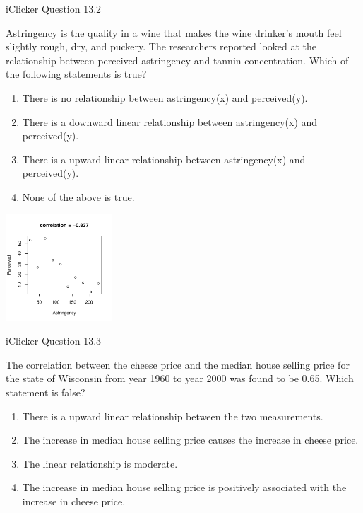 \documentclass[14pt]{beamer}\usepackage[]{graphicx}\usepackage[]{color}
\begin{document}
\begin{frame}[fragile]{iClicker Question 13.2}

{\small{
Astringency is the quality in a wine that makes the wine drinker's mouth feel slightly rough, dry, and puckery.  The researchers reported looked at the relationship between perceived astringency and tannin concentration.  Which of the following  statements is true?
}}

\vspace{3mm}

\begin{minipage}[ht]{6cm}

{\footnotesize{
\begin{enumerate}
\item There is no relationship between  astringency(x) and perceived(y).
\item There is a downward linear  relationship between astringency(x) and perceived(y).
\item There is a upward linear relationship  between astringency(x) and perceived(y).
\item None of the above is true.
\end{enumerate}
}}
\end{minipage} \hfill
\begin{minipage}[ht]{4cm}



\includegraphics[width=4cm]{figure/LBL13b-1} 

\end{minipage}
\end{frame}

\begin{frame}[fragile]{iClicker Question 13.3}

The correlation between the cheese price and the median house  selling price for the state of Wisconsin from year 1960 to year 2000  was found to be 0.65. Which statement is false?

\begin{enumerate}
\item There is a upward linear relationship between the two  measurements.
\item The increase in median house selling price causes the  increase in cheese price.
\item The linear relationship is moderate.
\item The increase in median house selling price is positively  associated with the increase in cheese price.
\end{enumerate}
\end{frame}
\end{document}
